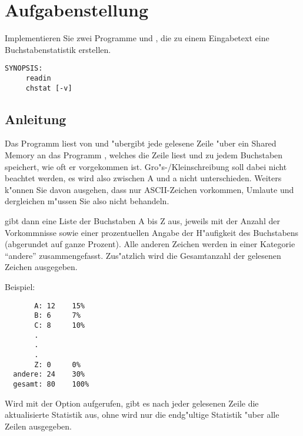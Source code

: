 




\section*{Aufgabenstellung}

Implementieren Sie zwei Programme  und , die
zu einem Eingabetext eine Buchstabenstatistik erstellen.

\begin{verbatim}
SYNOPSIS:
     readin
     chstat [-v]
\end{verbatim} 




\subsection*{Anleitung}

Das Programm  liest von  und "ubergibt jede
gelesene Zeile "uber ein Shared Memory an das Programm ,
welches die Zeile liest und zu jedem Buchstaben speichert, wie oft er
vorgekommen ist. Gro"s-/Kleinschreibung soll dabei nicht beachtet
werden, es wird also zwischen A und a nicht unterschieden. Weiters
k"onnen Sie davon ausgehen, dass nur ASCII-Zeichen vorkommen, Umlaute
und dergleichen m"ussen Sie also nicht behandeln.

 gibt dann eine Liste der Buchstaben A bis Z aus, jeweils
mit der Anzahl der Vorkommnisse sowie einer prozentuellen Angabe der
H"aufigkeit des Buchstabens (abgerundet auf ganze Prozent). Alle
anderen Zeichen werden in einer Kategorie ``andere''
zusammengefasst. Zus"atzlich wird die Gesamtanzahl der gelesenen
Zeichen ausgegeben.

Beispiel:
\begin{verbatim}
       A: 12    15%
       B: 6     7%
       C: 8     10%
       .
       .
       .
       Z: 0     0%
  andere: 24    30%
  gesamt: 80    100%
\end{verbatim}

Wird  mit der Option  aufgerufen, gibt es nach
jeder gelesenen Zeile die aktualisierte Statistik aus, ohne 
wird nur die endg"ultige Statistik "uber alle Zeilen ausgegeben.


